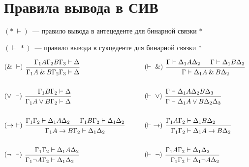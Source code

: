 \documentclass[main]{subfiles}
\begin{document}
\section{Правила вывода в СИВ}
$(*\ \vdash)$~--- правило вывода в антецеденте для бинарной связки $*$

$(\vdash \ *)$~--- правило вывода в сукцеденте для бинарной связки $*$

\begin{align*}
     & \begin{prooftree}
           \hypo{\Gamma_1 A\Gamma_2 B\Gamma_3 &\vdash \Delta}
           \infer[left label=$(\and \ \vdash)$]1{\Gamma_1 A \and B \Gamma_2 \Gamma_3 &\vdash \Delta}
       \end{prooftree} &
    \qquad
     & \begin{prooftree}
           \hypo{ \Gamma &\vdash \Delta_1A\Delta_2 }
           \hypo{ \Gamma &\vdash \Delta_1 B\Delta_2}
           \infer[left label=$(\vdash \ \and)$]2{ \Gamma \vdash \Delta_1 A \and B \Delta_2}
       \end{prooftree}          &
    \\
    \\
     & \begin{prooftree}
           \hypo{\Gamma_1 B\Gamma_2 &\vdash \Delta}
           \infer[left label=$(\lor \ \vdash)$]1{\Gamma_1 A\lor B\Gamma_2 &\vdash \Delta}
       \end{prooftree}            &
    \qquad
     & \begin{prooftree}
           \hypo{\Gamma &\vdash \Delta_1A\Delta_2B\Delta_3}
           \infer[left label=$(\vdash \ \lor)$]1{\Gamma &\vdash \Delta_1 A\lor B\Delta_2\Delta_3}
       \end{prooftree}    &
    \\
    \\
     & \begin{prooftree}
           \hypo{\Gamma_1\Gamma_2 &\vdash \Delta_1 A \Delta_2}
           \hypo{\Gamma_1B\Gamma_2 &\vdash\Delta_1\Delta_2}
           \infer[left label=$(\to \ \vdash)$]2{\Gamma_1 A\to B\Gamma_2 \vdash \Delta_1 \Delta_2}
       \end{prooftree}    &
    \qquad
     & \begin{prooftree}
           \hypo{\Gamma_1A\Gamma_2 &\vdash \Delta_1B\Delta_2}
           \infer[left label=$(\vdash \ \to)$]1{\Gamma_1\Gamma_2 &\vdash \Delta_1A\to B \Delta_2}
       \end{prooftree}    &
    \\
    \\
     & \begin{prooftree}
           \hypo{\Gamma_1 \Gamma_2 &\vdash \Delta_1A\Delta_2}
           \infer[left label=$(\lnot\ \vdash)$]1{\Gamma_1 \lnot A\Gamma_2 &\vdash \Delta_1\Delta_2}
       \end{prooftree}  &
    \qquad
     & \begin{prooftree}
           \hypo{\Gamma_1 A\Gamma_2 &\vdash \Delta_1\Delta_2}
           \infer[left label=$(\vdash \ \lnot)$]1{\Gamma_1 \Gamma_2 &\vdash \Delta_1\lnot A\Delta_2}
       \end{prooftree} &
\end{align*}
\end{document}
